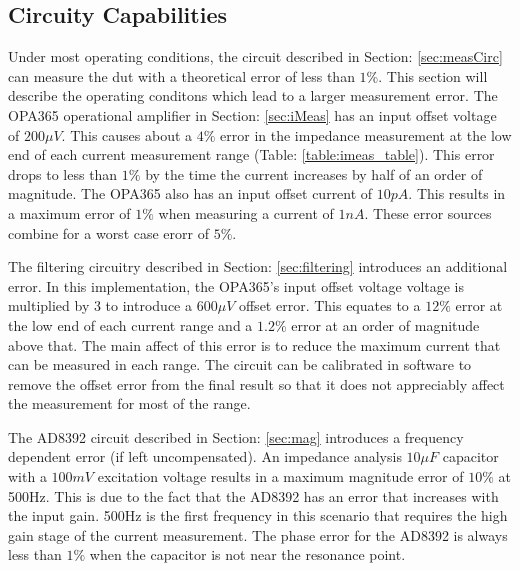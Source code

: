 \subsection{Circuity Capabilities}

Under most operating conditions, the circuit described in Section: \ref{sec:measCirc} can measure the \gls{dut} with a theoretical error of less than $1\%$. This section will describe the operating conditons which lead to a larger measurement error. The OPA365 operational amplifier in Section: \ref{sec:iMeas} has an input offset voltage of $200\mu V$. This causes about a $4\%$ error in the impedance measurement at the low end of each current measurement range (Table: \ref{table:imeas_table}). This error drops to less than $1\%$ by the time the current increases by half of an order of magnitude.  The OPA365 also has an input offset current of $10pA$. This results in a maximum error of $1\%$ when measuring a current of $1nA$. These error sources combine for a worst case erorr of $5\%$.

The filtering circuitry described in Section: \ref{sec:filtering} introduces an additional error. In this implementation, the OPA365's input offset voltage voltage is multiplied by 3 to introduce a $600\mu V$ offset error. This equates to a $12\%$ error at the low end of each current range and a $1.2\%$ error at an order of magnitude above that. The main affect of this error is to reduce the maximum current that can be measured in each range. The circuit can be calibrated in software to remove the offset error from the final result so that it does not appreciably affect the measurement for most of the range.

The AD8392 circuit described in Section: \ref{sec:mag} introduces a frequency dependent error (if left uncompensated). An impedance analysis $10\mu F$ capacitor with a $100mV$ excitation voltage results in a maximum magnitude error of $10\%$ at 500Hz. This is due to the fact that the AD8392 has an error that increases with the input gain. 500Hz is the first frequency in this scenario that requires the high gain stage of the current measurement. The phase error for the AD8392 is always less than $1\%$ when the capacitor is not near the resonance point.

